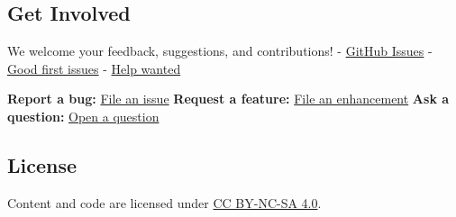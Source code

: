 \subsection{Get Involved}\label{get-involved}

We welcome your feedback, suggestions, and contributions! -
\href{https://github.com/OER-Forge/OER-Forge/issues}{GitHub Issues} -
\href{https://github.com/OER-Forge/OER-Forge/labels/good\%20first\%20issue}{Good
first issues} -
\href{https://github.com/OER-Forge/OER-Forge/labels/help\%20wanted}{Help
wanted}

\textbf{Report a bug:}
\href{https://github.com/OER-Forge/OER-Forge/issues/new?labels=bug}{File
an issue} \textbf{Request a feature:}
\href{https://github.com/OER-Forge/OER-Forge/issues/new?labels=enhancement}{File
an enhancement} \textbf{Ask a question:}
\href{https://github.com/OER-Forge/OER-Forge/issues/new?labels=question}{Open
a question}

\subsection{License}\label{license}

Content and code are licensed under
\href{https://creativecommons.org/licenses/by-nc-sa/4.0/}{CC BY-NC-SA
4.0}.
